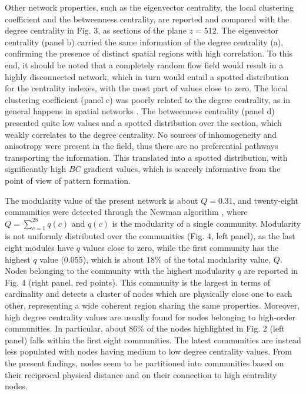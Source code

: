 \documentclass{ws-ijbc}
\begin{document}
Other network properties, such as the eigenvector centrality, the local clustering coefficient and the betweenness centrality, are reported and compared with the degree centrality in Fig. 3, as sections of the plane $z=512$. The eigenvector centrality (panel b) carried the same information of the degree centrality (a), confirming the presence of distinct spatial regions with high correlation. To this end, it should be noted that a completely random flow field would result in a highly disconnected network, which in turn would entail a spotted distribution for the centrality indexes, with the most part of values close to zero. The local clustering coefficient (panel c) was poorly related to the degree centrality, as in general happens in spatial networks \cite{Boccaletti2006}. The betweenness centrality (panel d) presented quite low values and a spotted distribution over the section, which weakly correlates to the degree centrality. No sources of inhomogeneity and anisotropy were present in the field, thus there are no preferential pathways transporting the information. This translated into a spotted distribution, with significantly high $BC$ gradient values, which is scarcely informative from the point of view of pattern formation.

The modularity value of the present network is about $Q=0.31$, and twenty-eight communities were detected through the Newman algorithm \cite{newman2004,newman2006}, where $Q=\sum_{c=1}^{28} q(c)$ and $q(c)$ is the modularity of a single community. Modularity is not uniformly distributed over the communities (Fig. 4, left panel), as the last eight modules have $q$ values close to zero, while the first community has the highest $q$ value (0.055), which is about $18\%$ of the total modularity value, $Q$. Nodes belonging to the community with the highest modularity $q$ are reported in Fig. 4 (right panel, red points). This community is the largest in terms of cardinality and detects a cluster of nodes which are physically close one to each other, representing a wide coherent region sharing the same properties. Moreover, high degree centrality values are usually found for nodes belonging to high-order communities. In particular, about $86\%$ of the nodes highlighted in Fig. 2 (left panel) falls within the first eight communities. The latest communities are instead less populated with nodes having medium to low degree centrality values. From the present findings, nodes seem to be partitioned into communities based on their reciprocal physical distance and on their connection to high centrality nodes.
\end{document}
